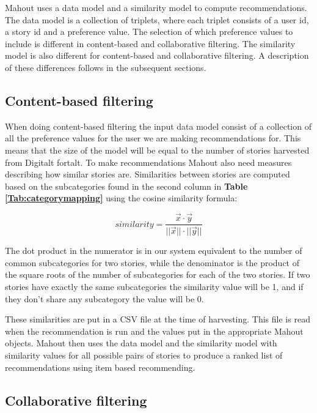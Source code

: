 Mahout uses a data model and a similarity model to compute recommendations. The data model is a collection of triplets, where each triplet consists of a user id, a story id and a preference value. The selection of which preference values to include is different in content-based and collaborative filtering. The similarity model is also different for content-based and collaborative filtering. A description of these differences follows in the subsequent sections.    

\subsection{Content-based filtering}

When doing content-based filtering the input data model consist of a collection of all the preference values for the user we are making recommendations for. This means that the size of the model will be equal to the number of stories harvested from Digitalt fortalt. To make recommendations Mahout also need measures describing how similar stories are. Similarities between stories are computed based on the subcategories found in the second column in \textbf{Table \ref{Tab:categorymapping}} using the cosine similarity formula: 

\begin{equation}
similarity = \frac{\vec{x}\cdot\vec{y}}{||\vec{x}||\cdot||\vec{y}||}
\end{equation}

The dot product in the numerator is in our system equivalent to the number of common subcategories for two stories, while the denominator is the product of the square roots of the number of subcategories for each of the two stories. If two stories have exactly the same subcategories the similarity value will be 1, and if they don't share any subcategory the value will be 0. \newline

These similarities are put in a CSV file at the time of harvesting. This file is read when the recommendation is run and the values put in the appropriate Mahout objects. Mahout then uses the data model and the similarity model with similarity values for all possible pairs of stories to produce a ranked list of recommendations using item based recommending.


\subsection{Collaborative filtering}

